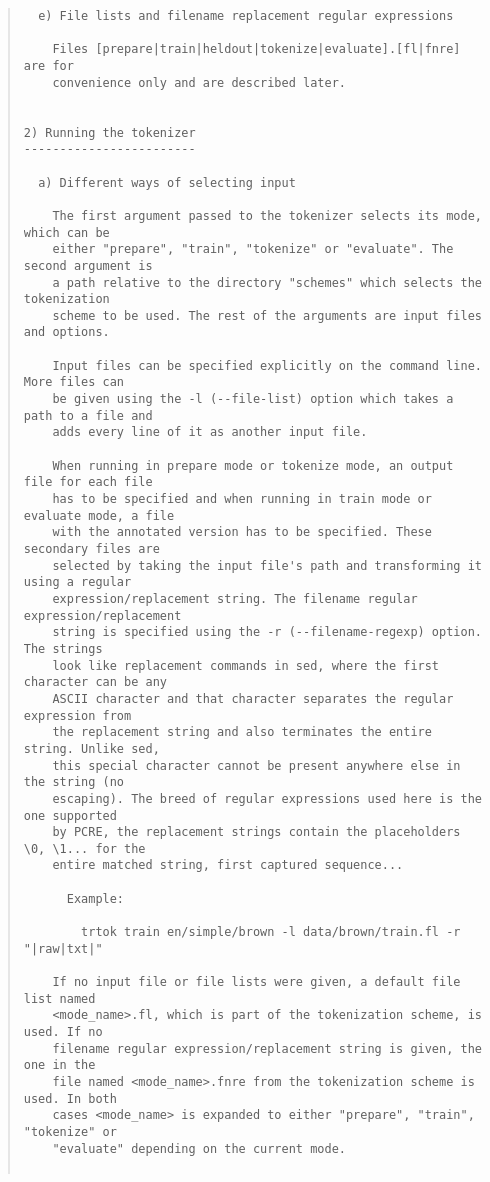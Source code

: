 \begin{scriptsize}
\begin{quote}
\begin{verbatim}
  e) File lists and filename replacement regular expressions

    Files [prepare|train|heldout|tokenize|evaluate].[fl|fnre] are for
    convenience only and are described later.
 

2) Running the tokenizer
------------------------

  a) Different ways of selecting input

    The first argument passed to the tokenizer selects its mode, which can be
    either "prepare", "train", "tokenize" or "evaluate". The second argument is
    a path relative to the directory "schemes" which selects the tokenization
    scheme to be used. The rest of the arguments are input files and options.

    Input files can be specified explicitly on the command line. More files can
    be given using the -l (--file-list) option which takes a path to a file and
    adds every line of it as another input file.

    When running in prepare mode or tokenize mode, an output file for each file
    has to be specified and when running in train mode or evaluate mode, a file
    with the annotated version has to be specified. These secondary files are
    selected by taking the input file's path and transforming it using a regular
    expression/replacement string. The filename regular expression/replacement
    string is specified using the -r (--filename-regexp) option. The strings
    look like replacement commands in sed, where the first character can be any
    ASCII character and that character separates the regular expression from
    the replacement string and also terminates the entire string. Unlike sed,
    this special character cannot be present anywhere else in the string (no
    escaping). The breed of regular expressions used here is the one supported
    by PCRE, the replacement strings contain the placeholders \0, \1... for the
    entire matched string, first captured sequence...
      
      Example:

        trtok train en/simple/brown -l data/brown/train.fl -r "|raw|txt|"

    If no input file or file lists were given, a default file list named
    <mode_name>.fl, which is part of the tokenization scheme, is used. If no
    filename regular expression/replacement string is given, the one in the
    file named <mode_name>.fnre from the tokenization scheme is used. In both
    cases <mode_name> is expanded to either "prepare", "train", "tokenize" or
    "evaluate" depending on the current mode.


\end{verbatim}
\end{quote}
\end{scriptsize}
